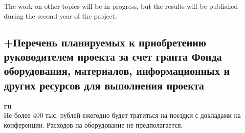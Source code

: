 \documentclass[12pt]{article}  %
\theoremstyle{remark}
\begin{document}
The work on other topics will be in progress, but the results will be published during the second year of the project.

\subsection{+Перечень планируемых к приобретению руководителем проекта за счет гранта Фонда оборудования, материалов, информационных и других ресурсов для выполнения проекта}

\textbf{ru}\\
%
Не более 400 тыс. рублей ежегодно будет тратиться на поездки с докладами на конференции. Расходов на оборудование не предполагается.
\end{document}
